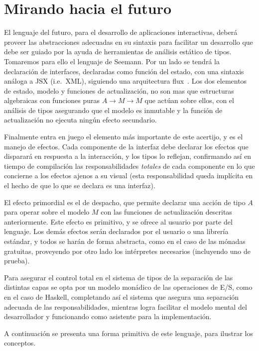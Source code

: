 \documentclass[12pt]{article}
\begin{document}
\section{Mirando hacia el futuro}


El lenguaje del futuro, para el desarrollo de aplicaciones interactivas, deberá
proveer las abstracciones adecuadas en su sintaxis para facilitar un desarrollo
que debe ser guiado por la ayuda de herramientas de análisis estático de tipos.
Tomaremos para ello el lenguaje de Seemann.
Por un lado se tendrá la declaración de interfaces, declaradas como función del
estado, con una sintaxis análoga a JSX (i.e.\ XML), siguiendo una arquitectura
flux~\autocite{flux}.
Los dos elementos de estado, modelo y funciones de actualización, no son mas
que estructuras algebraicas con funciones puras \(A \to M \to M\) que actúan
sobre ellos, con el análisis de tipos asegurando que el modelo es inmutable y
la función de actualización no ejecuta ningún efecto secundario.

Finalmente entra en juego el elemento más importante de este acertijo, y es el
manejo de efectos.
Cada componente de la interfaz debe declarar los efectos que disparará en
respuesta a la interacción, y los tipos lo reflejan, confirmando así en tiempo
de compilación las responsabilidades \emph{totales} de cada componente
en lo que concierne a los efectos ajenos a su visual (esta responsabilidad queda
implícita en el hecho de que lo que se declara es una interfaz).

El efecto primordial es el de despacho, que permite declarar una acción de tipo
\(A\) para operar sobre el modelo \(M\) con las funciones de actualización
descritas anteriormente.  Este efecto es primitivo, y se ofrece al usuario por
parte del lenguaje.
Los demás efectos serán declarados por el usuario o una librería estándar, y
todos se harán de forma abstracta, como en el caso de las mónadas gratuitas,
proveyendo por otro lado los intérpretes necesarios (incluyendo uno de prueba).

Para asegurar el control total en el sistema de tipos de la separación de las
distintas capas se opta por un modelo monádico de las operaciones de E/S, como
en el caso de Haskell, completando así el sistema que asegura una separación
adecuada de las responsabilidades, mientras logra facilitar el modelo mental
del desarrollador y funcionando como asistente para la implementación.

A continuación se presenta una forma primitiva de este lenguaje, para ilustrar
los conceptos.
\end{document}
